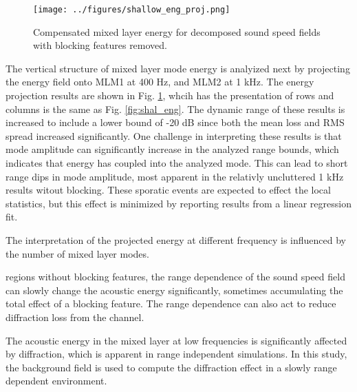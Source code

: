 \documentclass[preprint,NumberedRefs]{JASA}
\begin{document}
\begin{figure}
\texttt{[image: ../figures/shallow\_eng\_proj.png]}
    \caption{Compensated mixed layer energy for decomposed sound speed fields with blocking features removed.}
    \label{fig:shal_no_block}
\end{figure}
The vertical structure of mixed layer mode energy is analyized next by projecting the energy field onto MLM1 at 400 Hz, and MLM2 at 1 kHz. The energy projection results are shown in Fig. \ref{fig:shal_no_block}, whcih has the presentation of rows and columns is the same as Fig. \ref{fig:shal_eng}. The dynamic range of these results is increased to include a lower bound of -20 dB since both the mean loss and RMS spread increased significantly. One challenge in interpreting these results is that mode amplitude can significantly increase in the analyzed range bounds, which indicates that energy has coupled into the analyzed mode. This can lead to short range dips in mode amplitude, most apparent in the relativly uncluttered 1 kHz results witout blocking. These sporatic events are expected to effect the local statistics, but this effect is minimized by reporting results from a linear regression fit.

The interpretation of the projected energy at different frequency is influenced by the number of mixed layer modes.


 regions without blocking features, the range dependence of the sound speed field can slowly change the acoustic energy significantly, sometimes accumulating the total effect of a blocking feature. The range dependence can also act to reduce diffraction loss from the channel.

The acoustic energy in the mixed layer at low frequencies is significantly affected by diffraction, which is apparent in range independent simulations. In this study, the background field is used to compute the diffraction effect in a slowly range dependent environment.





\end{document}
